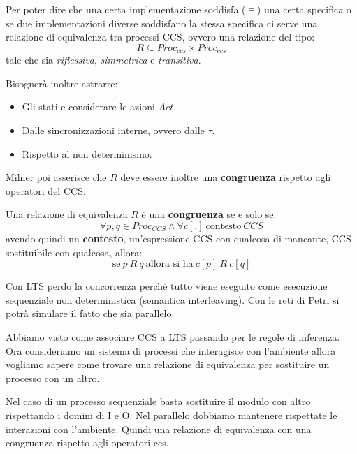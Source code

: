 Per poter dire che una certa implementazione soddisfa ($\models$) una certa
specifica o se due implementazioni diverse soddisfano la stessa specifica ci
serve una relazione di equivalenza tra processi CCS, ovvero una relazione del
tipo:
\begin{equation}
    R \subseteq Proc_{ccs} \times Proc_{ccs}
\end{equation}
tale che sia \textit{riflessiva}, \textit{simmetrica} e \textit{transitiva}.

Bisognerà inoltre astrarre:
\begin{itemize}
    \item Gli stati e considerare le azioni $Act$.
    \item Dalle sincronizzazioni interne, ovvero dalle $\tau$.
    \item Rispetto al non determinismo.
\end{itemize}
Milner poi asserisce che $R$ deve essere inoltre una \textbf{congruenza} rispetto
agli operatori del CCS.
\begin{definizione}
    Una relazione di equivalenza $R$ è una \textbf{congruenza} se e solo se:
    \begin{equation}
        \forall p, q \in Proc_{CCS} \land \forall c[.] \ \text{contesto} \ CCS
    \end{equation}
    avendo quindi un \textbf{contesto}, un'espressione CCS con qualcosa di mancante,
    CCS sostituibile con qualcosa, allora:
    \begin{equation}
        \text{se} \ p\ R\ q \ \text{allora si ha} \ c[p] \ R \ c[q]
    \end{equation}
\end{definizione}
Con LTS perdo la concorrenza perché tutto viene eseguito come esecuzione
sequenziale non deterministica (semantica interleaving). Con le reti di Petri
si potrà simulare il fatto che sia parallelo.

Abbiamo visto come associare CCS a LTS passando per le regole di inferenza.
Ora consideriamo un sistema di processi che interagisce con l'ambiente allora
vogliamo sapere come trovare una relazione di equivalenza per sostituire un
processo con un altro.

Nel caso di un processo sequenziale basta sostituire il modulo con altro
rispettando i domini di I e O. Nel parallelo dobbiamo mantenere rispettate
le interazioni con l'ambiente. Quindi una relazione di equivalenza con una
congruenza rispetto agli operatori ccs.

